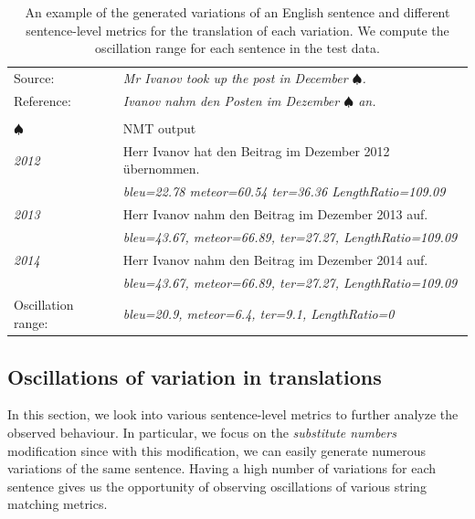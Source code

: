\begin{table}[htb!]
\centering
\caption{An example of the generated variations of an English sentence and different sentence-level metrics for the translation of each variation. We compute the oscillation range for each sentence in the test data. \label{oscmetexams}}
\begin{tabularx}{.97\columnwidth}{ll}
\toprule
Source: & \textit{Mr Ivanov took up the post in December {$\spadesuit$}.} \\
Reference: & \textit{Ivanov nahm den Posten im Dezember {$\spadesuit$} an.} \\
\hline
\\[-0.5ex]
{$\spadesuit$}  & \textcolor{mygray}{NMT output} \\
\hline
  \textit{2012} & Herr Ivanov hat den Beitrag im Dezember 2012 {\"u}bernommen.  \\
  &  \textcolor{mygray}{\textit{bleu=22.78 meteor=60.54 ter=36.36 LengthRatio=109.09}} \\
  \textit{2013} &  Herr Ivanov nahm den Beitrag im Dezember 2013 auf.  \\
  &  \textcolor{mygray}{\textit{bleu=43.67, meteor=66.89, ter=27.27, LengthRatio=109.09}} \\
  \textit{2014} &  Herr Ivanov nahm den Beitrag im Dezember 2014 auf. \\
  &  \textcolor{mygray}{\textit{bleu=43.67, meteor=66.89, ter=27.27, LengthRatio=109.09}} \\
  \hline %
{Oscillation range:} & \textit{bleu=20.9, meteor=6.4, ter=9.1, LengthRatio=0} \\
\bottomrule
\end{tabularx}
\end{table}

\subsection{Oscillations of variation in translations}

In this section, we look into various sentence-level metrics to further analyze the observed behaviour. 
In particular, we focus on the \textit{substitute numbers} modification since with this modification, we can easily generate numerous variations of the same sentence. %
Having a high number of variations for each sentence gives us the opportunity of observing oscillations of various string matching metrics. 

